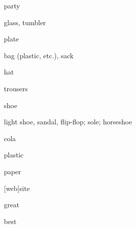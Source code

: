 \documentclass[avery5371,grid,frame]{flashcards}
\begin{document}
\begin{flashcard}{\LARGE party}
\LARGE {}
\end{flashcard}
\begin{flashcard}{\LARGE glass, tumbler}
\LARGE {}
\end{flashcard}
\begin{flashcard}{\LARGE plate}
\LARGE {}
\end{flashcard}
\begin{flashcard}{\LARGE bag (plastic, etc.), sack}
\LARGE {}
\end{flashcard}
\begin{flashcard}{\LARGE hat}
\LARGE {}
\end{flashcard}
\begin{flashcard}{\LARGE trousers}
\LARGE {}
\end{flashcard}
\begin{flashcard}{\LARGE shoe}
\LARGE {}
\end{flashcard}
\begin{flashcard}{\LARGE light shoe, sandal, flip-flop; sole; horseshoe}
\LARGE {}
\end{flashcard}
\begin{flashcard}{\LARGE cola}
\LARGE {}
\end{flashcard}
\begin{flashcard}{\LARGE plastic}
\LARGE {}
\end{flashcard}
\begin{flashcard}{\LARGE paper}
\LARGE {}
\end{flashcard}
\begin{flashcard}{\LARGE {[}web{]}site}
\LARGE {}
\end{flashcard}
\begin{flashcard}{\LARGE great}
\LARGE {}
\end{flashcard}
\begin{flashcard}{\LARGE best}
\LARGE {}
\end{flashcard}
\end{document}
